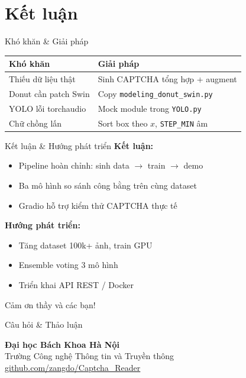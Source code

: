 \documentclass[aspectratio=169,12pt]{beamer}
\begin{document}
\section{Kết luận}

\begin{frame}{Khó khăn \& Giải pháp}
  \begin{table}
    \small
    \begin{tabular}{p{4.2cm}p{7.5cm}}
      \toprule
      \textbf{Khó khăn} & \textbf{Giải pháp} \\
      \midrule
      Thiếu dữ liệu thật & Sinh CAPTCHA tổng hợp + augment \\
      Donut cần patch Swin & Copy \texttt{modeling\_donut\_swin.py} \\
      YOLO lỗi torchaudio & Mock module trong \texttt{YOLO.py} \\
      Chữ chồng lấn & Sort box theo $x$, \texttt{STEP\_MIN} âm \\
      \bottomrule
    \end{tabular}
  \end{table}
\end{frame}

\begin{frame}{Kết luận \& Hướng phát triển}
  \textbf{Kết luận:}
  \begin{itemize}
    \item Pipeline hoàn chỉnh: sinh data $\rightarrow$ train $\rightarrow$ demo
    \item Ba mô hình so sánh công bằng trên cùng dataset
    \item Gradio hỗ trợ kiểm thử CAPTCHA thực tế
  \end{itemize}

  \vspace{0.3cm}
  \textbf{Hướng phát triển:}
  \begin{itemize}
    \item Tăng dataset 100k+ ảnh, train GPU
    \item Ensemble voting 3 mô hình
    \item Triển khai API REST / Docker
  \end{itemize}
\end{frame}

\begin{frame}
  \begin{center}
    {\Huge Cảm ơn thầy và các bạn!}

    \vspace{1cm}
    {\Large Câu hỏi \& Thảo luận}

    \vspace{1cm}
    \small
    \textbf{Đại học Bách Khoa Hà Nội}\\
    Trường Công nghệ Thông tin và Truyền thông\\[0.3cm]
    \href{https://github.com/zangdo/Captcha_Reader}{github.com/zangdo/Captcha\_Reader}
  \end{center}
\end{frame}
\end{document}
